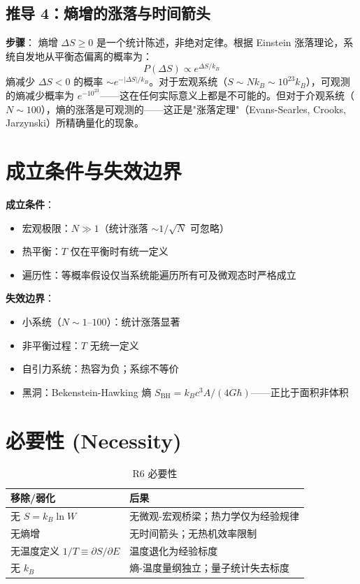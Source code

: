 \subsection{推导 4：熵增的涨落与时间箭头}

\textbf{步骤}：\fbox{[S]} 熵增 $\Delta S \ge 0$ 是一个统计陈述，非绝对定律。根据 Einstein 涨落理论，系统自发地从平衡态偏离的概率为：
\begin{equation}
P(\Delta S) \propto e^{\Delta S/k_B}
\end{equation}
\fbox{[S]} 熵减少 $\Delta S < 0$ 的概率 $\sim e^{-|\Delta S|/k_B}$。对于宏观系统（$S \sim Nk_B \sim 10^{23}k_B$），可观测的熵减少概率为 $e^{-10^{23}}$——这在任何实际意义上都是不可能的。但对于介观系统（$N \sim 100$），熵的涨落是可观测的——这正是"涨落定理"（Evans-Searles, Crooks, Jarzynski）所精确量化的现象。

\section{成立条件与失效边界}

\begin{limitbox}[R6 的成立条件与失效边界]
  \textbf{成立条件}：
  \begin{itemize}
    \item 宏观极限：$N \gg 1$（统计涨落 $\sim 1/\sqrt{N}$ 可忽略）
    \item 热平衡：$T$ 仅在平衡时有统一定义
    \item 遍历性：等概率假设仅当系统能遍历所有可及微观态时严格成立
  \end{itemize}

  \textbf{失效边界}：
  \begin{itemize}
    \item 小系统（$N \sim 1\text{--}100$）：统计涨落显著
    \item 非平衡过程：$T$ 无统一定义
    \item 自引力系统：热容为负；系综不等价
    \item 黑洞：Bekenstein-Hawking 熵 $S_{\text{BH}} = k_B c^3 A/(4G\hbar)$——正比于面积非体积
  \end{itemize}
\end{limitbox}

\section{必要性 (Necessity)}

\begin{table}[h]
\centering
\small
\begin{tabular}{p{4cm}p{7cm}}
\toprule
\textbf{移除/弱化} & \textbf{后果} \\
\midrule
无 $S = k_B \ln W$ & 无微观-宏观桥梁；热力学仅为经验规律 \\
无熵增 & 无时间箭头；无热机效率限制 \\
无温度定义 $1/T \equiv \partial S/\partial E$ & 温度退化为经验标度 \\
无 $k_B$ & 熵-温度量纲独立；量子统计失去标度 \\
\bottomrule
\end{tabular}
\caption{R6 必要性}
\end{table}

